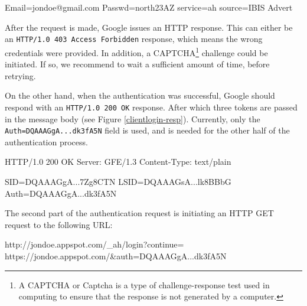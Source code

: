\documentclass[a4paper,10pt]{article}
\begin{document}
\begin{figure*}[ht] %
\begin{center}
\begin{code}
Email=jondoe@gmail.com
Passwd=north23AZ
service=ah
source=IBIS Advert
\end{code}
\caption{Authentication Data for ClientLogin.\label{clientlogin-req}}
\end{center}
\end{figure*}

After the request is made, Google issues an HTTP response. This can either be
an \texttt{HTTP/1.0 403 Access Forbidden} response, which means the wrong
credentials were provided. In addition, a CAPTCHA\footnote{A CAPTCHA or Captcha
is a type of challenge-response test used in computing to ensure that the
response is not generated by a computer.} challenge could be initiated. If so,
we recommend to wait a sufficient amount of time, before retrying.

On the other hand, when the authentication was successful, Google should respond
with an \texttt{HTTP/1.0 200 OK} response. After which three tokens are passed
in the message body (see Figure \ref{clientlogin-resp}). Currently, only the
\texttt{Auth=DQAAAGgA...dk3fA5N} field is used, and is needed for the other
half of the authentication process.

\begin{figure*}[ht] %
\begin{center}
\begin{code}
HTTP/1.0 200 OK
Server: GFE/1.3
Content-Type: text/plain

SID=DQAAAGgA...7Zg8CTN
LSID=DQAAAGsA...lk8BBbG
Auth=DQAAAGgA...dk3fA5N
\end{code}
\caption{ClientLogin Response.\label{clientlogin-resp}}
\end{center}
\end{figure*}

The second part of the authentication request is initiating an HTTP GET request
to the following URL:

\begin{center}
\begin{code}
http://jondoe.appspot.com/_ah/login?continue=
    https://jondoe.appspot.com/&auth=DQAAAGgA...dk3fA5N
\end{code}
\end{center}
\end{document}
